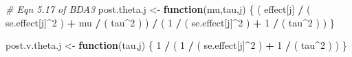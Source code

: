 \documentclass[]{article}
\newenvironment{Shaded}{\begin{snugshade}}{\end{snugshade}}
\newcommand{\DecValTok}[1]{\textcolor[rgb]{0.00,0.00,0.81}{#1}}
\newcommand{\StringTok}[1]{\textcolor[rgb]{0.31,0.60,0.02}{#1}}
\newcommand{\CommentTok}[1]{\textcolor[rgb]{0.56,0.35,0.01}{\textit{#1}}}
\newcommand{\ControlFlowTok}[1]{\textcolor[rgb]{0.13,0.29,0.53}{\textbf{#1}}}
\newcommand{\OperatorTok}[1]{\textcolor[rgb]{0.81,0.36,0.00}{\textbf{#1}}}
\newcommand{\NormalTok}[1]{#1}
\begin{document}
\begin{Shaded}
\begin{Highlighting}[]
\CommentTok{# Eqn 5.17 of BDA3}
\NormalTok{post.theta.j    <-}\StringTok{ }\ControlFlowTok{function}\NormalTok{(mu,tau,j) \{}
\NormalTok{  ( effect[j] }\OperatorTok{/}\StringTok{ }\NormalTok{( se.effect[j]}\OperatorTok{^}\DecValTok{2}\NormalTok{ ) }\OperatorTok{+}\StringTok{ }\NormalTok{mu }\OperatorTok{/}\StringTok{ }\NormalTok{( tau}\OperatorTok{^}\DecValTok{2}\NormalTok{ ) ) }\OperatorTok{/}
\StringTok{  }\NormalTok{( }\DecValTok{1} \OperatorTok{/}\StringTok{ }\NormalTok{( se.effect[j]}\OperatorTok{^}\DecValTok{2}\NormalTok{ ) }\OperatorTok{+}\StringTok{ }\DecValTok{1} \OperatorTok{/}\StringTok{ }\NormalTok{( tau}\OperatorTok{^}\DecValTok{2}\NormalTok{ ) ) }
\NormalTok{\}}

\NormalTok{post.v.theta.j  <-}\StringTok{ }\ControlFlowTok{function}\NormalTok{(tau,j) \{}
  \DecValTok{1} \OperatorTok{/}\StringTok{ }\NormalTok{( }\DecValTok{1} \OperatorTok{/}\StringTok{ }\NormalTok{( se.effect[j]}\OperatorTok{^}\DecValTok{2}\NormalTok{ ) }\OperatorTok{+}\StringTok{ }\DecValTok{1} \OperatorTok{/}\StringTok{ }\NormalTok{( tau}\OperatorTok{^}\DecValTok{2}\NormalTok{ ) )}
\NormalTok{\}}



\end{Highlighting}
\end{Shaded}
\end{document}
